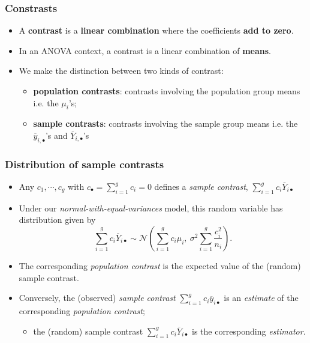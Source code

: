 \documentclass[a4paper]{article}
\begin{document}
\subsubsection{Constrasts}
\begin{itemize}
	\item A \textbf{contrast} is a \textbf{linear combination} where the coefficients \textbf{add to zero}.
	\item In an ANOVA context, a contrast is a linear combination of \textbf{means}.
	\item We make the distinction between two kinds of contrast:
	\begin{itemize}
		\item \textcolor{mygreen}{\textbf{population contrasts}}: contrasts involving the population group means i.e. the \( \mu_i \)'s;
		\item \textcolor{myred}{\textbf{sample contrasts}}: contrasts involving the sample group means i.e. the \( \overline{y}_{i,\bullet} \)'s and \( \overline{Y}_{i,\bullet} \)'s 
	\end{itemize}
\end{itemize}
\subsubsection{Distribution of sample contrasts}
\begin{itemize}
	\item Any \( c_1,\dotsb,c_g \) with \( c_\bullet = \sum_{i=1}^{g} c_i = 0 \) defines a \textit{sample contrast}, \( \sum_{i=1}^{g} c_i \overline{Y}_{i\bullet} \)  
	\item Under our \textit{normal-with-equal-variances} model, this random variable has distribution given by
	\[
		\sum_{i=1}^gc_i\overline Y_{i\bullet}\sim \mathcal{N}\left( \sum_{i=1}^gc_i\mu_i,\ \sigma^2 \sum_{i=1}^g \frac{c_i^2}{n_i} \right).
	\]
	\item The corresponding \textit{population contrast} is the expected value of the (random) sample contrast.
	\item Conversely, the (observed) \textit{sample contrast} \( \sum\limits_{i=1}^gc_i \overline y_{i\bullet} \) is an \textit{estimate} of the corresponding \textit{population contrast};
	\begin{itemize}
		\item the (random) sample contrast \( \sum\limits_{i=1}^gc_i \overline Y_{i\bullet} \) is the corresponding \textit{estimator}.
	\end{itemize}
\end{itemize}
\end{document}
